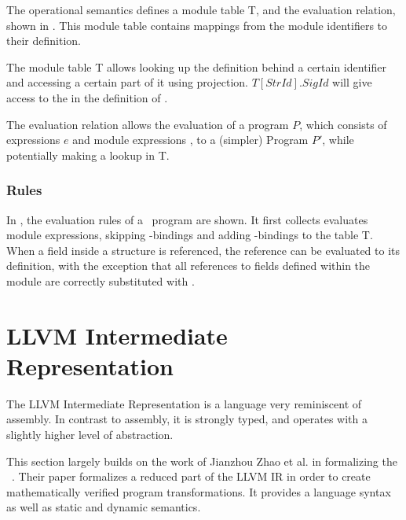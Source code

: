 The operational semantics defines a module table T, and the evaluation relation, shown in .
This module table contains mappings from the %
module identifiers to their definition. 

The module table T allows looking up the definition behind a certain identifier and accessing a certain part of it using projection. $T[\mathit{StrId}].\mathit{SigId}$ will give access to the  in the definition of . 

The evaluation relation allows the evaluation of a program $P$, which consists of expressions $e$ and module expressions , to a (simpler) Program $P'$, while potentially making a lookup in T.

\subsubsection{Rules}
In , the evaluation rules of a \MiniML\ program are shown.
It first collects evaluates module expressions, skipping -bindings and adding -bindings to the table T.
When a field inside a structure is referenced, the reference can be evaluated to its definition, with the exception that all references to fields  defined within the module are correctly substituted with .




\clearpage
\section{LLVM Intermediate Representation}
The LLVM Intermediate Representation is a language very reminiscent of assembly.
In contrast to assembly, it is strongly typed, and operates with a slightly higher level of abstraction.

This section largely builds on the work of Jianzhou Zhao et al. in formalizing the \LLVMIR~\cite{Zhao:2012:FLI:2103656.2103709}.
Their paper formalizes a reduced part of the LLVM IR in order to create mathematically verified program transformations.
It provides a language syntax as well as static and dynamic semantics.

